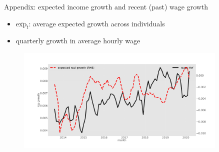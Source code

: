 \documentclass{beamer}
\begin{document}
\begin{frame}{Appendix: expected income growth and recent (past) wage growth}
	\label{appendix:tsMean3mvrexp_he}
	\begin{itemize}
		\item $\overline{\text{exp}_{t}} $: average expected growth across individuals
		\item  quarterly growth in average hourly wage
	\end{itemize}
	\begin{figure}
		\centering
		\label{ts_exp}
		\includegraphics[width=0.9\textwidth]{figures/tsMean3mvrexp_he.jpg}
	\end{figure}
	\quad  \hyperlink{tsMean3mvrvar_he}{} 
\end{frame}
\end{document}
